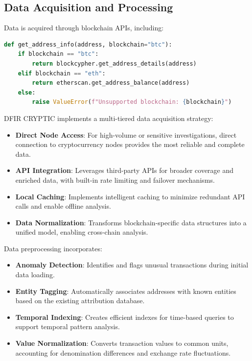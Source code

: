 \documentclass[conference]{IEEEtran}
\begin{document}
\subsection{Data Acquisition and Processing}

Data is acquired through blockchain APIs, including:
\begin{lstlisting}[language=Python]
def get_address_info(address, blockchain="btc"):
    if blockchain == "btc":
        return blockcypher.get_address_details(address)
    elif blockchain == "eth":
        return etherscan.get_address_balance(address)
    else:
        raise ValueError(f"Unsupported blockchain: {blockchain}")
\end{lstlisting}

DFIR CRYPTIC implements a multi-tiered data acquisition strategy:

\begin{itemize}
    \item \textbf{Direct Node Access}: For high-volume or sensitive investigations, direct connection to cryptocurrency nodes provides the most reliable and complete data.
    
    \item \textbf{API Integration}: Leverages third-party APIs for broader coverage and enriched data, with built-in rate limiting and failover mechanisms.
    
    \item \textbf{Local Caching}: Implements intelligent caching to minimize redundant API calls and enable offline analysis.
    
    \item \textbf{Data Normalization}: Transforms blockchain-specific data structures into a unified model, enabling cross-chain analysis.
\end{itemize}

Data preprocessing incorporates:

\begin{itemize}
    \item \textbf{Anomaly Detection}: Identifies and flags unusual transactions during initial data loading.
    
    \item \textbf{Entity Tagging}: Automatically associates addresses with known entities based on the existing attribution database.
    
    \item \textbf{Temporal Indexing}: Creates efficient indexes for time-based queries to support temporal pattern analysis.
    
    \item \textbf{Value Normalization}: Converts transaction values to common units, accounting for denomination differences and exchange rate fluctuations.
\end{itemize}
\end{document}
